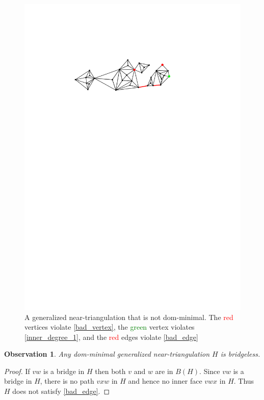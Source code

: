 \documentclass{article}
\newtheorem{obs}{Observation}
\theoremstyle{definition}
\begin{document}
\begin{figure}[htbp]
  \centering
  \includegraphics[page=2]{figs/dom_minimal}
  \caption{A generalized near-triangulation that is not dom-minimal. The \textcolor{red}{red} vertices violate \cref{bad_vertex}, the \textcolor{green}{green} vertex violates \cref{inner_degree_1}, and the \textcolor{red}{red} edges violate \cref{bad_edge}}
  \label{dom_minimal_fig}
\end{figure}

\begin{obs}\label{bridgeless}
    Any dom-minimal generalized near-triangulation $H$ is bridgeless.
\end{obs}

\begin{proof}
   If $vw$ is a bridge in $H$ then both $v$ and $w$ are in $B(H)$.  Since $vw$ is a bridge in $H$, there is no path $vxw$ in $H$ and hence no inner face $vwx$ in $H$. Thus $H$ does not satisfy \cref{bad_edge}.
\end{proof}
\end{document}
